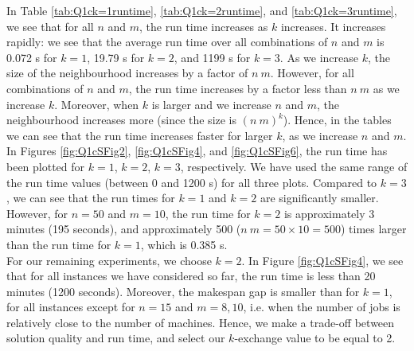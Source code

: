 \documentclass[12pt,a4paper,reqno]{article}
\begin{document}
In Table  \ref{tab:Q1ck=1runtime}, \ref{tab:Q1ck=2runtime}, and \ref{tab:Q1ck=3runtime}, we see that for all $n$ and $m$, the run time increases as $k$ increases. It increases rapidly: we see that the average run time over all combinations of $n$ and $m$ is 0.072 s for $k=1$, 19.79 s for $k=2$, and 1199 s for $k=3$. As we increase $k$, the size of the neighbourhood increases by a factor of $n \> m$. However, for all combinations of $n$ and $m$, the run time increases by a factor less than $n \> m$ as we increase $k$. Moreover, when $k$ is larger and we increase $n$ and $m$, the neighbourhood increases more (since the size is $(n \> m)^k$). Hence, in the tables we can see that the run time increases faster for larger $k$, as we increase $n$ and $m$. In Figures \ref{fig:Q1cSFig2}, \ref{fig:Q1cSFig4}, and \ref{fig:Q1cSFig6}, the run time has been plotted for $k=1$, $k=2$, $k=3$, respectively. We have used the same range of the run time values (between 0 and 1200 s) for all three plots. Compared to $k=3$, we can see that the run times for $k=1$ and $k=2$ are significantly smaller. However, for $n=50$ and $m=10$, the run time for $k=2$ is approximately 3 minutes (195 seconds), and approximately 500 ($n \> m = 50 \times 10 = 500$) times larger than the run time for $k=1$, which is 0.385 s.   \\

For our remaining experiments, we choose $k=2$. In Figure \ref{fig:Q1cSFig4}, we see that for all instances we have considered so far, the run time is less than 20 minutes (1200 seconds). Moreover, the makespan gap is smaller than for $k=1$, for all instances except for $n=15$ and $m=8,10$, i.e. when the number of jobs is relatively close to the number of machines. Hence, we make a trade-off between solution quality and run time, and select our $k$-exchange value to be equal to 2.
\end{document}
